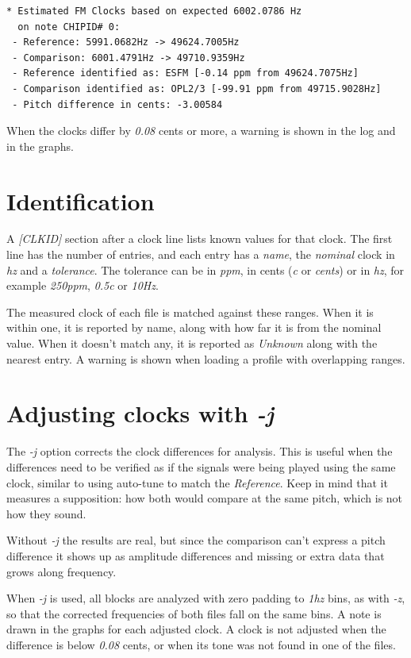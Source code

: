 \documentclass[10pt,a4paper]{report}
\newcommand{\ac}[1]{\textit{\mbox{\acrshort{#1}}}}
\newcommand{\hz}[1]{\textit{\mbox{#1\acrshort{hz}}}}
\begin{document}
\begin{appendices}
\begin{verbatim}
* Estimated FM Clocks based on expected 6002.0786 Hz
  on note CHIPID# 0:
 - Reference: 5991.0682Hz -> 49624.7005Hz
 - Comparison: 6001.4791Hz -> 49710.9359Hz
 - Reference identified as: ESFM [-0.14 ppm from 49624.7075Hz]
 - Comparison identified as: OPL2/3 [-99.91 ppm from 49715.9028Hz]
 - Pitch difference in cents: -3.00584
\end{verbatim}

When the clocks differ by \textit{0.08} cents or more, a warning is shown in the log and in the graphs.

\section{Identification}

A \textit{[CLKID]} section after a clock line lists known values for that clock. The first line has the number of entries, and each entry has a \textit{name}, the \textit{nominal} clock in \ac{hz} and a \textit{tolerance}. The tolerance can be in \textit{ppm}, in cents (\textit{c} or \textit{cents}) or in \ac{hz}, for example \textit{250ppm}, \textit{0.5c} or \textit{10Hz}.

The measured clock of each file is matched against these ranges. When it is within one, it is reported by name, along with how far it is from the nominal value. When it doesn't match any, it is reported as \textit{Unknown} along with the nearest entry. A warning is shown when loading a profile with overlapping ranges.

\section{Adjusting clocks with \textit{-j}}

The \textit{-j} option corrects the clock differences for analysis. This is useful when the differences need to be verified as if the signals were being played using the same clock, similar to using auto-tune to match the \textit{Reference}. Keep in mind that it measures a supposition: how both would compare at the same pitch, which is not how they sound.

Without \textit{-j} the results are real, but since the comparison can't express a pitch difference it shows up as amplitude differences and missing or extra data that grows along frequency. 

When \textit{-j} is used, all blocks are analyzed with zero padding to \hz{1} bins, as with \textit{-z}, so that the corrected frequencies of both files fall on the same bins. A note is drawn in the graphs for each adjusted clock. A clock is not adjusted when the difference is below \textit{0.08} cents, or when its tone was not found in one of the files.


\end{appendices}
\end{document}
